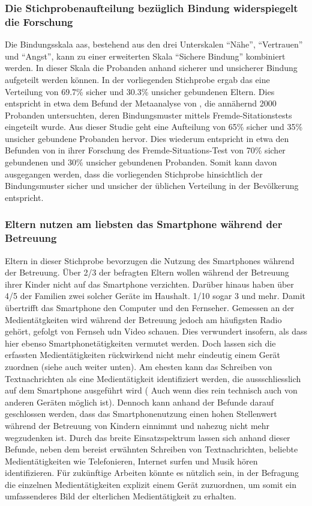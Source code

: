 \subsubsection{Die Stichprobenaufteilung bezüglich Bindung widerspiegelt die Forschung}
Die Bindungsskala \acrfull{aas}, bestehend aus den drei Unterskalen \enquote{Nähe}, \enquote{Vertrauen} und \enquote{Angst}, kann zu einer erweiterten Skala \enquote{Sichere Bindung} kombiniert werden. In dieser Skala die Probanden anhand sicherer und unsicherer Bindung aufgeteilt werden können. In der vorliegenden Stichprobe ergab das eine Verteilung von 
69.7\% sicher und 30.3\% unsicher gebundenen Eltern. Dies entspricht in etwa dem Befund der Metaanalyse von , die annähernd 2000  Probanden untersuchten, deren Bindungsmuster mittels  Fremde-Sitationstests eingeteilt wurde. Aus dieser Studie geht eine Aufteilung von 65\% sicher und 35\% unsicher gebundene Probanden hervor. Dies wiederum entspricht in etwa den Befunden von  in ihrer Forschung des Fremde-Situations-Test von 70\% sicher gebundenen und 30\% unsicher gebundenen Probanden. Somit kann davon ausgegangen werden, dass die vorliegenden Stichprobe hinsichtlich der Bindungsmuster sicher und unsicher der üblichen Verteilung in der Bevölkerung entspricht.

\subsubsection{Eltern nutzen am liebsten das Smartphone während der Betreuung}
Eltern in dieser Stichprobe bevorzugen die Nutzung des Smartphones während der Betreuung. Über 2/3 der befragten Eltern wollen während der Betreuung ihrer Kinder nicht auf das Smartphone verzichten. Darüber hinaus haben über 4/5 der Familien zwei solcher Geräte im Haushalt. 1/10 sogar 3 und mehr. Damit übertrifft das Smartphone den Computer und den Fernseher. Gemessen an der Medientätgkeiten wird während der Betreuung jedoch am häufigsten Radio gehört, gefolgt von Fernseh udn Video schauen. Dies verwundert insofern, als dass hier ebenso Smartphonetätigkeiten vermutet werden. Doch lassen sich die erfassten Medientätigkeiten rückwirkend nicht mehr eindeutig einem Gerät zuordnen (siehe auch \textit{} weiter unten). Am ehesten kann das Schreiben von Textnachrichten als eine Medientätigkeit identifiziert werden, die aussschliesslich auf dem Smartphone ausgeführt wird ( Auch wenn dies rein technisch auch von anderen Geräten möglich ist). Dennoch kann anhand der Befunde darauf geschlossen werden, dass das Smartphonenutzung einen hohen Stellenwert während der Betreuung von Kindern einnimmt und nahezug nicht mehr wegzudenken ist. Durch das breite Einsatzspektrum lassen sich anhand dieser Befunde, neben dem bereist erwähnten Schreiben von Textnachrichten, beliebte Medientätigkeiten wie Telefonieren, Internet surfen und Musik hören identifizieren. Für zukünftige Arbeiten könnte es nützlich sein, in der Befragung die einzelnen Medientätigkeiten explizit einem Gerät zuzuordnen, um somit ein umfassenderes Bild der elterlichen Medientätigkeit zu erhalten.  



